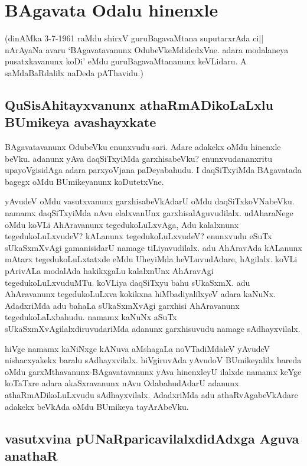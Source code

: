 \chapter{BAgavata Odalu hinenxle}

(dinAMka 3-7-1961 raMdu shirxV guruBagavaMtana suputarxrAda ci|| nArAyaNa avaru `BAgavatavanunx OdubeVkeMdidedxVne. adara modalaneya pusatxkavanunx koDi' eMdu guruBagavaMtananunx keVLidaru. A‌ saMdaBaRdalilx naDeda pAThavidu.)

\section*{QuSisAhitayxvanunx athaRmADikoLaLxlu BUmikeya avashayxkate}

BAgavatavanunx OdubeVku enunxvudu sari. Adare adakekx oMdu hinenxle beVku. adanunx yAva daqSiTxyiMda garxhisabeVku? enunxvudananxritu upayoVgisidAga adara parxyoVjana paDeyabahudu. I daqSiTxyiMda BAgavatada bagegx oMdu BUmikeyanunx koDutetxVne.

yAvudeV oMdu vasutxvanunx garxhisabeVkAdarU oMdu daqSiTxkoVNabeVku. namamx daqSiTxyiMda nAvu elalxvanUnx garxhisalAguvudilalx. udAharaNege oMdu koVLi AhAravanunx  tegedukoLuLxvAga, Adu kalalxnunx tegedukoLuLxvudeV? kALanunx  tegedukoLuLxvudeV? enunxvudu eSuTx sUkaSxmXvAgi gamanisidarU namage tiLiyavudilalx. adu AhAravAda kALanunx mAtarx tegedukoLuLxtatxde eMdu UheyiMda heVLuvudAdare, hAgilalx. koVLi pArivALa modalAda hakikxgaLu kalalxnUnx AhAravAgi tegedukoLuLxvuduMTu. koVLiya daqSiTxyu bahu sUkaSxmX. adu AhAravanunx tegedukoLuLxva kokikxna hiMbadiyalilxyeV adara kaNuNx. AdadxriMda adu bahaLa sUkaSxmXvAgi garxhisi AhAravanunx tegedukoLaLxbahudu. namamx kaNuNx aSuTx sUkaSxmXvAgilalxdiruvudariMda adanunx garxhisuvudu namage sAdhayxvilalx. 

hiVge namamx kaNiNxge kANuva aMshagaLa noVTadiMdaleV yAvudeV nishacxyakekx baralu sAdhayxvilalx. hiVgiruvAda yAvudoV BUmikeyalilx bareda oMdu garxMthavanunx-BAgavatavanunx yAva hinenxleyU ilalxde namamx keYge koTaTxre adara akaSxravanunx nAvu OdabahudAdarU adanunx athaRmADikoLuLxvudu sAdhayxvilalx. AdadxriMda adu athaRvAgabeVkAdare adakekx beVkAda oMdu BUmikeya tayArAbeVku. 


\section*{vasutxvina pUNaRparicavilalxdidAdxga Aguva anathaR}

